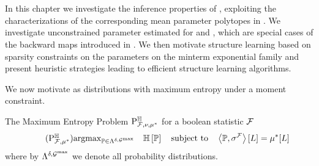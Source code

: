 \chapter{\chatextnetworkReasoning}\label{cha:networkReasoning}

In this chapter we investigate the inference properties of \HybridLogicNetworks{}, exploiting the characterizations of the corresponding mean parameter polytopes in .
We investigate unconstrained parameter estimated for \MarkovLogicNetworks{} and \HybridLogicNetworks{}, which are special cases of the backward maps introduced in .
We then motivate structure learning based on sparsity constraints on the parameters on the minterm exponential family and present heuristic strategies leading to efficient structure learning algorithms.




 \label{sec:parameterEstimation} %

We now motivate \HybridLogicNetworks{} as distributions with maximum entropy under a moment constraint.




The Maximum Entropy Problem $\mathrm{P}^{\mathbb{H}}_{\mathcal{F},\nu,\mu^*}$ for a boolean statistic $\mathcal{F}$ %
\begin{align}
    \label{prob:maxEntropyHLN}\tag{$\probtagtypeinst{\entropysymbol}{\mlnstat,\genmean}$}
    \argmax_{\probtensor\in\alldists} \quad \sentropyof{\probtensor}
    \stspace
    \contractionof{\probtensor,\sencmlnstat}{\selvariable}
    =  \genmeanwith
\end{align}
where by $\Lambda^{\delta,\mathcal{G}^{\mathrm{max}}}$ we denote all probability distributions.

